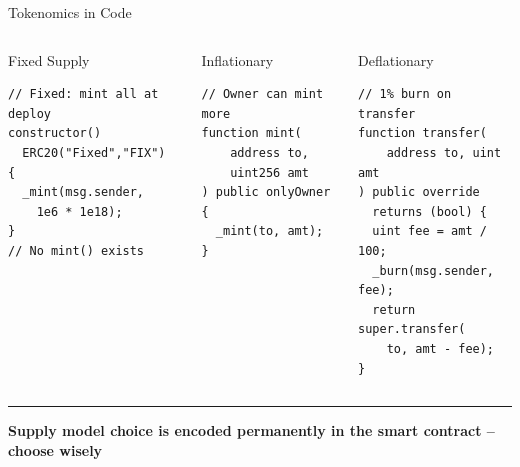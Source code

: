 \documentclass[8pt,aspectratio=169]{beamer}
\newcommand{\bottomnote}[1]{\vfill\vspace{-2mm}\textcolor{mllavender2}{\rule{\textwidth}{0.4pt}}\vspace{1mm}\footnotesize\textbf{#1}}
\begin{document}
\begin{frame}[fragile]{Tokenomics in Code}
  \begin{columns}[T]
      \begin{block}{\scriptsize Fixed Supply}
        \begin{lstlisting}[basicstyle=\tiny\ttfamily,
            language=Solidity,
            breaklines=true]
// Fixed: mint all at deploy
constructor()
  ERC20("Fixed","FIX")
{
  _mint(msg.sender,
    1e6 * 1e18);
}
// No mint() exists
        \end{lstlisting}
      \end{block}

      \begin{block}{\scriptsize Inflationary}
        \begin{lstlisting}[basicstyle=\tiny\ttfamily,
            language=Solidity,
            breaklines=true]
// Owner can mint more
function mint(
    address to,
    uint256 amt
) public onlyOwner {
  _mint(to, amt);
}
        \end{lstlisting}
      \end{block}

      \begin{block}{\scriptsize Deflationary}
        \begin{lstlisting}[basicstyle=\tiny\ttfamily,
            language=Solidity,
            breaklines=true]
// 1% burn on transfer
function transfer(
    address to, uint amt
) public override
  returns (bool) {
  uint fee = amt / 100;
  _burn(msg.sender, fee);
  return super.transfer(
    to, amt - fee);
}
        \end{lstlisting}
      \end{block}
  \end{columns}
  \bottomnote{Supply model choice is encoded permanently in the smart contract -- choose wisely}
\end{frame}
\end{document}
